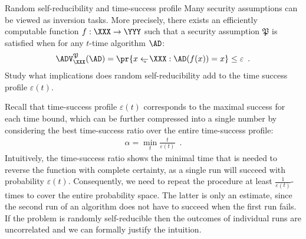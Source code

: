 \documentclass{crypto-exercise}
\author{Sven Laur}
\begin{document}
\begin{exercise}{Random self-reducibility and time-success profile}
Many security assumptions can be viewed as inversion tasks. More precisely, there exists 
an efficiently computable function $f:\XXX\to\YYY$ such that a security assumption $\mathfrak{P}$ is satisfied 
when for any $t$-time algorithm $\AD$:
\begin{align*}
\ADV_{\XXX}^\mathfrak{P}(\AD)=\pr{x\getsu\XXX: \AD(f(x))=x}\leq\varepsilon\enspace.
\end{align*}
Study what implications does random self-reducibility add to the time success profile $\varepsilon(t)$.

\end{exercise}
\begin{solution}
Recall that time-success profile $\varepsilon(t)$  corresponds to the maximal success for each time bound, which can be further compressed into a single number by considering the best time-success ratio over the entire time-success profile:
\begin{align*}
\alpha = \min_t \frac{t}{\varepsilon(t)}\enspace.
\end{align*}
Intuitively, the time-success ratio shows the minimal time that is needed to  reverse the function with complete certainty, as a single run will succeed with probability $\varepsilon(t)$. Consequently, we need to repeat the procedure at least $\frac{1}{\varepsilon(t)}$-times to cover the entire probability space. The latter is only an estimate, since the second run of an algorithm does not have to succeed when the first run fails. If the problem is randomly self-reducible then the outcomes of individual runs are uncorrelated and we can formally justify the intuition. 


\end{solution}
\end{document}
